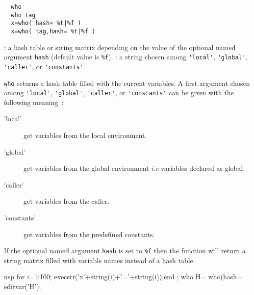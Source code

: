 \begin{mandesc}
\end{mandesc}

\begin{calling_sequence}
\begin{verbatim}
  who
  who tag 
  x=who( hash= %t|%f )
  x=who( tag,hash= %t|%f )
\end{verbatim}
\end{calling_sequence}
\begin{parameters}
  \begin{varlist}
    : a hash table or string matrix depending on the value of 
    the optional named argument \verb+hash+ (default value is \verb+%f+).
    : a string chosen among \verb+'local'+,  \verb+'global'+,
    \verb+'caller'+, or  \verb+'constants'+.
  \end{varlist}
\end{parameters}
\begin{mandescription}
  \verb!who! returns a hash table filled with the current variables. 
  A first argument chosen among \verb+'local'+,  \verb+'global'+,
  \verb+'caller'+, or  \verb+'constants'+ can be given with the following 
  meaning~:
\begin{description}
  \item['local'] get variables from the local environment. 
  \item['global'] get variables from the global environment \emph{i.e} 
    variables declared as global.
  \item['caller'] get variables from the caller. 
  \item['constants'] get variables from the predefined constants. 
\end{description}
  If the optional 
  named argument \verb+hash+ is set to \verb+%f+ then the function will 
  return a string matrix filled with variable names instead of a hash table.
\end{mandescription} 
\begin{examples}
  \begin{mintednsp}{nsp} 
    for i=1:100; execstr('x'+string(i)+'='+string(i));end ;
    who 
    H= who(hash=%
    editvar('H');
  \end{mintednsp}
\end{examples}



